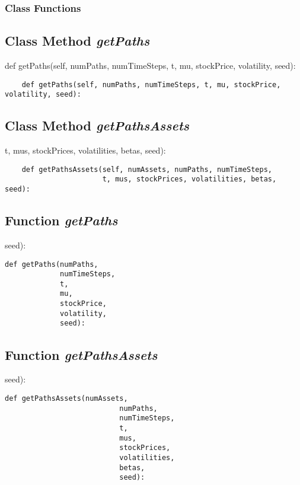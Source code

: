\documentclass[twoside,11pt]{book}
\begin{document}
\subsubsection{Class Functions}

\subsection{Class Method {\it getPaths}}
def getPaths(self, numPaths, numTimeSteps, t, mu, stockPrice, volatility, seed):    

\begin{lstlisting}
    def getPaths(self, numPaths, numTimeSteps, t, mu, stockPrice, volatility, seed):    
\end{lstlisting}

\subsection{Class Method {\it getPathsAssets}}
t, mus, stockPrices, volatilities, betas, seed):    

\begin{lstlisting}
    def getPathsAssets(self, numAssets, numPaths, numTimeSteps, 
                       t, mus, stockPrices, volatilities, betas, seed):    
\end{lstlisting}

\subsection{Function {\it getPaths}}
seed):

\begin{lstlisting}
def getPaths(numPaths,
             numTimeSteps,
             t,
             mu,
             stockPrice,
             volatility,
             seed):
\end{lstlisting}

\subsection{Function {\it getPathsAssets}}
seed):    

\begin{lstlisting}
def getPathsAssets(numAssets,
                           numPaths,
                           numTimeSteps,
                           t,
                           mus,
                           stockPrices,
                           volatilities,
                           betas,
                           seed):    
\end{lstlisting}
\end{document}
